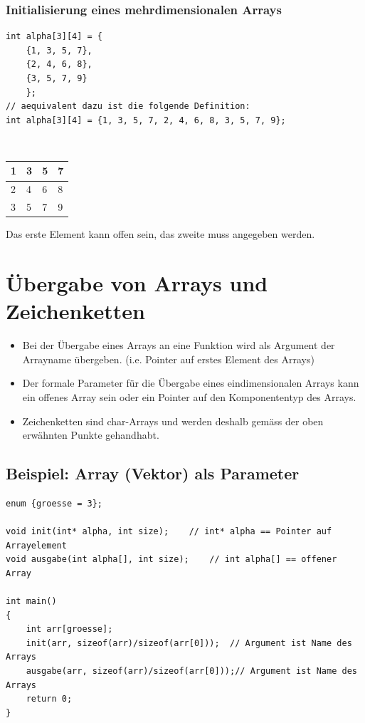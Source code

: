\subsubsection{Initialisierung eines mehrdimensionalen Arrays}
\label{sec:Initialisierung eines mehrdimensionalen Arrays}
\noindent
\begin{minipage}{\linewidth}
\begin{lstlisting}
int alpha[3][4] = {
	{1, 3, 5, 7},
	{2, 4, 6, 8},
	{3, 5, 7, 9}
	};
// aequivalent dazu ist die folgende Definition:
int alpha[3][4] = {1, 3, 5, 7, 2, 4, 6, 8, 3, 5, 7, 9};
\end{lstlisting}
\end{minipage}
\\
\centering
\begin{tabularx}{0.25\textwidth}{|X|X|X|X|}
	\hline
	1 & 3 & 5 & 7\\
	\hline
	2 & 4 & 6 & 8\\
	\hline
	3 & 5 & 7 & 9\\
	\hline
\end{tabularx}
\flushleft
\begin{hinweis}
	Das erste Element kann offen sein, das zweite muss angegeben werden.
\end{hinweis}



\section{Übergabe von Arrays und Zeichenketten}
\label{sec:Uebergabe von Arrays und Zeichenketten}
\begin{itemize}
	\item Bei der Übergabe eines Arrays an eine Funktion wird als Argument der Arrayname übergeben. (i.e. Pointer auf erstes Element des Arrays)
	\item Der formale Parameter für die Übergabe eines eindimensionalen Arrays kann ein offenes Array sein oder ein Pointer auf den Komponententyp des Arrays.
	\item Zeichenketten sind char-Arrays und werden deshalb gemäss der oben erwähnten Punkte gehandhabt.
\end{itemize}

\subsection{Beispiel: Array (Vektor) als Parameter}
\label{sec:Beispiel: Array (Vektor) als Parameter}
\noindent
\begin{minipage}{\linewidth}
\begin{lstlisting}
enum {groesse = 3};

void init(int* alpha, int size);	// int* alpha == Pointer auf Arrayelement
void ausgabe(int alpha[], int size);	// int alpha[] == offener Array

int main()
{
	int arr[groesse];
	init(arr, sizeof(arr)/sizeof(arr[0]));	// Argument ist Name des Arrays
	ausgabe(arr, sizeof(arr)/sizeof(arr[0]));// Argument ist Name des Arrays
	return 0;
}
\end{lstlisting}
\end{minipage}

